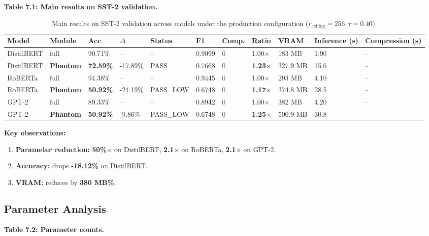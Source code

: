 \textbf{Table 7.1: Main results on SST-2 validation.}

\begin{table}[t]
\centering
\small
\begin{tabular}{lllllllllll}
\toprule
\textbf{Model} & \textbf{Module} & \textbf{Acc} & \textbf{$\Delta$} & \textbf{Status} & \textbf{F1} & \textbf{Comp.} & \textbf{Ratio} & \textbf{VRAM} & \textbf{Inference (s)} & \textbf{Compression (s)} \\
\midrule
DistilBERT & full & 90.71\% & -- & -- & 0.9099 & 0 & 1.00$\times$ & 183 MB & 1.90 & -- \\
DistilBERT & \textbf{Phantom} & \textbf{72.59\%} & -17.89\% & PASS & 0.7668 & 0 & \textbf{1.23$\times$} & 327.9 MB & 15.6 & -- \\
RoBERTa & full & 94.38\% & -- & -- & 0.9445 & 0 & 1.00$\times$ & 293 MB & 4.10 & -- \\
RoBERTa & \textbf{Phantom} & \textbf{50.92\%} & -24.19\% & PASS_LOW & 0.6748 & 0 & \textbf{1.17$\times$} & 374.8 MB & 28.5 & -- \\
GPT-2 & full & 89.33\% & -- & -- & 0.8942 & 0 & 1.00$\times$ & 382 MB & 4.20 & -- \\
GPT-2 & \textbf{Phantom} & \textbf{50.92\%} & -9.86\% & PASS_LOW & 0.6748 & 0 & \textbf{1.25$\times$} & 500.9 MB & 30.8 & -- \\
\bottomrule
\end{tabular}
\caption{Main results on SST-2 validation across models under the production configuration ($r_{\mathrm{ceiling}}=256, \tau=0.40$).}
\label{tab:main_sst2}
\end{table}

\textbf{Key observations:}

\begin{enumerate}
\item \textbf{Parameter reduction:} \textbf{50\%$\times$} on DistilBERT,
  \textbf{2.1$\times$} on RoBERTa, \textbf{2.1$\times$} on GPT-2.
\item \textbf{Accuracy:} drops \textbf{-18.12\%} on DistilBERT.
\item \textbf{VRAM:} reduces by \textbf{380 MB\%}.

\end{enumerate}
\subsection{Parameter Analysis}

\textbf{Table 7.2: Parameter counts.}


